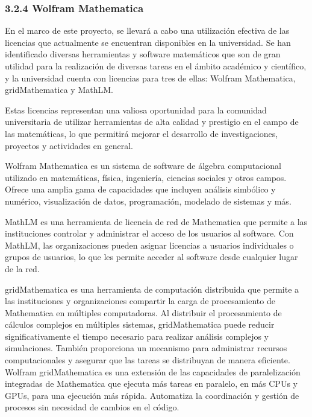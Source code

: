 \begin{spacing}{1.5}
  \subsubsection{3.2.4 Wolfram Mathematica}

  En el marco de este proyecto, se llevará a cabo una utilización efectiva de
  las licencias que actualmente se encuentran disponibles en la universidad. Se
  han identificado diversas herramientas y software matemáticos que son de gran
  utilidad para la realización de diversas tareas en el ámbito académico y
  científico, y la universidad cuenta con licencias para tres de ellas: Wolfram
  Mathematica, gridMathematica y MathLM.

  Estas licencias representan una valiosa oportunidad para la comunidad
  universitaria de utilizar herramientas de alta calidad y prestigio en el campo
  de las matemáticas, lo que permitirá mejorar el desarrollo de investigaciones,
  proyectos y actividades en general.

  Wolfram Mathematica es un sistema de software de álgebra computacional
  utilizado en matemáticas, física, ingeniería, ciencias sociales y otros campos.
  Ofrece una amplia gama de capacidades que incluyen análisis simbólico y
  numérico, visualización de datos, programación, modelado de sistemas y más.
  \cite{Wolfram-mathematica-1}

  MathLM es una herramienta de licencia de red de Mathematica que permite a
  las instituciones controlar y administrar el acceso de los usuarios al
  software. Con MathLM, las organizaciones pueden asignar licencias a usuarios
  individuales o grupos de usuarios, lo que les permite acceder al software desde
  cualquier lugar de la red. \cite{Wolfram-mathlm-1}

  gridMathematica es una herramienta de computación distribuida que permite a
  las instituciones y organizaciones compartir la carga de procesamiento de
  Mathematica en múltiples computadoras. Al distribuir el procesamiento de
  cálculos complejos en múltiples sistemas, gridMathematica puede reducir
  significativamente el tiempo necesario para realizar análisis complejos y
  simulaciones. También proporciona un mecanismo para administrar recursos
  computacionales y asegurar que las tareas se distribuyan de manera eficiente.
  Wolfram gridMathematica es una extensión de las capacidades de paralelización
  integradas de Mathematica que ejecuta más tareas en paralelo, en más CPUs y
  GPUs, para una ejecución más rápida. Automatiza la coordinación y gestión de
  procesos sin necesidad de cambios en el código. \cite{Wolfram-grid-1}


\end{spacing}

